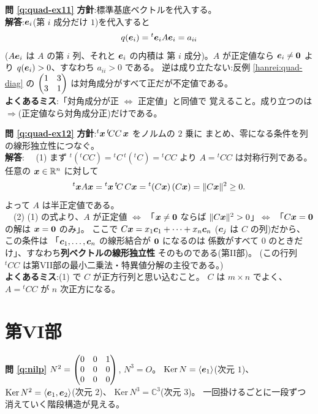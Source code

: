 \bigskip
\noindent\textbf{問 \ref{q:quad-ex11}}\quad
\textbf{方針}:標準基底ベクトルを代入する。\\
\textbf{解答}:$\bm{e}_i$(第 $i$ 成分だけ $1$)を代入すると
\[
q(\bm{e}_i) = {}^t\bm{e}_i A \bm{e}_i = a_{ii}
\]
($A\bm{e}_i$ は $A$ の第 $i$ 列、それと $\bm{e}_i$ の内積は
第 $i$ 成分)。$A$ が正定値なら $\bm{e}_i \neq \bm{0}$ より
$q(\bm{e}_i) > 0$、すなわち $a_{ii} > 0$ である。
逆は成り立たない:反例 \ref{hanrei:quad-diag} の
$\begin{pmatrix}1 & 3 \\ 3 & 1\end{pmatrix}$ は対角成分がすべて正だが不定値である。\\
\textbf{よくあるミス}:「対角成分が正 $\iff$ 正定値」と同値で
覚えること。成り立つのは $\Rightarrow$(正定値なら対角成分正)だけである。

\bigskip
\noindent\textbf{問 \ref{q:quad-ex12}}\quad
\textbf{方針}:${}^t\bm{x}\,{}^t\!CC\,\bm{x}$ をノルムの $2$ 乗に
まとめ、零になる条件を列の線形独立性につなぐ。\\
\textbf{解答}:
　(1) まず ${}^t({}^t\!CC) = {}^t\!C\,{}^t({}^t\!C) = {}^t\!CC$ より
$A = {}^t\!CC$ は対称行列である。任意の $\bm{x} \in \mathbb{R}^n$ に対して
\[
{}^t\bm{x}A\bm{x} = {}^t\bm{x}\,{}^t\!C\,C\bm{x}
= {}^t(C\bm{x})\,(C\bm{x}) = \|C\bm{x}\|^2 \ge 0.
\]
よって $A$ は半正定値である。\\
　(2) (1) の式より、$A$ が正定値 $\iff$
「$\bm{x} \neq \bm{0}$ ならば $\|C\bm{x}\|^2 > 0$」$\iff$
「$C\bm{x} = \bm{0}$ の解は $\bm{x} = \bm{0}$ のみ」。
ここで $C\bm{x} = x_1\bm{c}_1 + \cdots + x_n\bm{c}_n$
($\bm{c}_j$ は $C$ の列)だから、この条件は
「$\bm{c}_1, \dots, \bm{c}_n$ の線形結合が $\bm{0}$ になるのは
係数がすべて $0$ のときだけ」、すなわち\textbf{列ベクトルの線形独立性}
そのものである(第II部)。
(この行列 ${}^t\!CC$ は第VII部の最小二乗法・特異値分解の主役である。)\\
\textbf{よくあるミス}:(1) で $C$ が正方行列と思い込むこと。
$C$ は $m \times n$ でよく、$A = {}^t\!CC$ が $n$ 次正方になる。

\section*{第VI部}

\noindent\textbf{問 \ref{q:nilp}}\quad
$N^2 = \begin{pmatrix}0 & 0 & 1 \\ 0 & 0 & 0 \\ 0 & 0 & 0\end{pmatrix}$, $N^3 = O$。
$\mathrm{Ker}\,N = \langle \bm{e}_1 \rangle$(次元 $1$)、
$\mathrm{Ker}\,N^2 = \langle \bm{e}_1, \bm{e}_2 \rangle$(次元 $2$)、
$\mathrm{Ker}\,N^3 = \mathbb{C}^3$(次元 $3$)。
一回掛けるごとに一段ずつ消えていく階段構造が見える。

